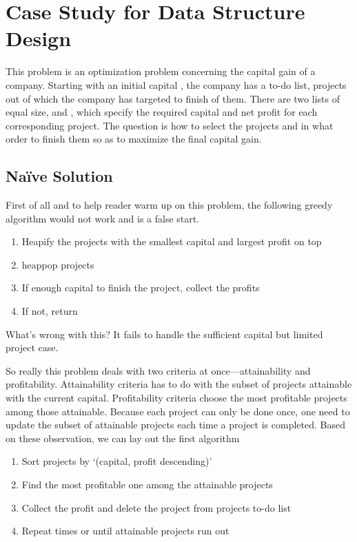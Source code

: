 
\section{Case Study for Data Structure Design}\label{sec:case-study-data-structure-design}

This problem is an optimization problem concerning the capital gain of a company.
Starting with an initial capital , the company has a to-do list, projects out of which
the company has targeted to finish  of them.
There are two lists of equal size,  and , which specify the required
capital and net profit for each corresponding project.
The question is how to select the projects and in what order to finish them so as to maximize the
final capital gain.

\subsection{Na\"{i}ve Solution}\label{subsec:max-cap-naive}
First of all and to help reader warm up on this problem, the following greedy algorithm would
not work and is a false start.
\begin{enumerate}
    \item Heapify the projects with the smallest capital and largest profit on top
    \item heappop projects
    \item If enough capital to finish the project, collect the profits
    \item If not, return
\end{enumerate}

What's wrong with this?
It fails to handle the sufficient capital but limited project case.

So really this problem deals with two criteria at once---attainability and profitability.
Attainability criteria has to do with the subset of projects attainable with the current capital.
Profitability criteria choose the most profitable projects among those attainable.
Because each project can only be done once, one need to update the subset of attainable projects
each time a project is completed.
Based on these observation, we can lay out the first algorithm
\begin{alisting}
    \caption{Na\"{i}ve algorithm for the `Max Capital' problem.\label{max-capital-naive-algo}}
    \begin{enumerate}
        \item Sort projects by `(capital, profit descending)'
        \item Find the most profitable one among the attainable projects
        \item Collect the profit and delete the project from projects to-do list
        \item Repeat  times or until attainable projects run out
    \end{enumerate}
\end{alisting}

